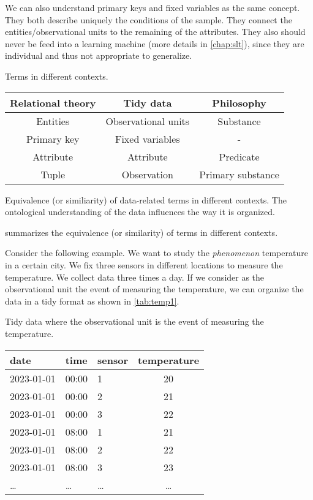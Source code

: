 We can also understand primary keys and fixed variables as the same concept.  They both
describe uniquely the conditions of the sample.  They connect the entities/observational
units to the remaining of the attributes.  They also should never be feed into a learning
machine (more details in \cref{chap:slt}), since they are individual and thus not
appropriate to generalize.

\begin{tablebox}[label=fig:bridge]{Terms in different contexts.}
  \centering
  \begin{tabular}{ccc}
    \toprule
    \textbf{Relational theory} & \textbf{Tidy data} & \textbf{Philosophy} \\
    \midrule
    Entities & Observational units & Substance \\
    Primary key & Fixed variables & - \\
    Attribute & Attribute & Predicate \\
    Tuple & Observation & Primary substance \\
    \bottomrule
  \end{tabular}
  \tcblower
  Equivalence (or similiarity) of data-related terms in different contexts.
  The ontological understanding of the data influences the way it is organized.
\end{tablebox}

 summarizes the equivalence (or similarity) of terms in different
contexts.

Consider the following example.  We want to study the \emph{phenomenon} temperature in a
certain city.  We fix three sensors in different locations to measure the temperature.  We
collect data three times a day.  If we consider as the observational unit the
event of measuring the temperature, we can organize the data in a tidy format as shown in
\cref{tab:temp1}.

\begin{tablebox}[label=tab:temp1]{Tidy data where the observational unit is the event of measuring the temperature.}
  \centering
  \begin{tabular}{lllc}
    \toprule
    date & time & sensor & temperature \\
    \midrule
    2023-01-01 & 00:00 & 1 & 20 \\
    2023-01-01 & 00:00 & 2 & 21 \\
    2023-01-01 & 00:00 & 3 & 22 \\
    2023-01-01 & 08:00 & 1 & 21 \\
    2023-01-01 & 08:00 & 2 & 22 \\
    2023-01-01 & 08:00 & 3 & 23 \\
    \dots & \dots & \dots & \dots \\
    \bottomrule
  \end{tabular}
\end{tablebox}

